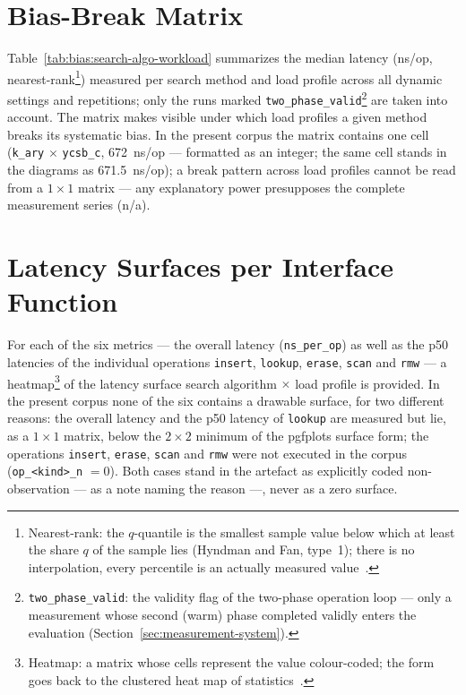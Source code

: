 \section{Bias-Break Matrix}\label{sec:measurements:bias}

Table~\ref{tab:bias:search-algo-workload} summarizes the median latency (ns/op,
nearest-rank\footnote{Nearest-rank: the $q$-quantile is the smallest sample value below which at
least the share $q$ of the sample lies (Hyndman and Fan, type~1); there is no interpolation, every
percentile is an actually measured value~\cite{hyndman1996quantiles}.}) measured per search method
and load profile across all dynamic settings and repetitions; only the runs marked
\texttt{two\_phase\_valid}\footnote{%
\texttt{two\_phase\_valid}: the validity flag of the two-phase operation loop --- only a measurement
whose second (warm) phase completed validly enters the evaluation
(Section~\ref{sec:measurement-system}).} are taken into account. The matrix makes visible under
which load profiles a given method breaks its systematic bias. In the present corpus the matrix
contains one cell (\texttt{k\_ary} $\times$ \texttt{ycsb\_c}, 672~ns/op --- formatted as an
integer; the same cell stands in the diagrams as 671.5~ns/op); a break pattern across load
profiles cannot be read from a $1{\times}1$ matrix --- any explanatory power presupposes the
complete measurement series (n/a).



\section{Latency Surfaces per Interface Function}\label{sec:measurements:surfaces}

For each of the six metrics --- the overall latency (\texttt{ns\_per\_op}) as well as the p50
latencies of the individual operations \texttt{insert}, \texttt{lookup}, \texttt{erase},
\texttt{scan} and \texttt{rmw} --- a heatmap\footnote{Heatmap: a matrix whose cells represent the
value colour-coded; the form goes back to the clustered heat map of
statistics~\cite{wilkinson2009heatmap}.} of the latency surface search algorithm $\times$ load
profile is provided. In the present corpus none of the six contains a drawable surface, for two
different reasons: the overall latency and the p50 latency of \texttt{lookup} are measured but
lie, as a $1{\times}1$ matrix, below the $2{\times}2$ minimum of the pgfplots surface form; the
operations \texttt{insert}, \texttt{erase}, \texttt{scan} and \texttt{rmw} were not executed in
the corpus (\texttt{op\_<kind>\_n} $= 0$). Both cases stand in the artefact as explicitly coded
non-observation --- as a note naming the reason ---, never as a zero surface.

